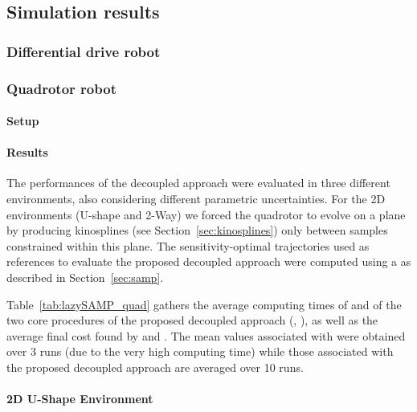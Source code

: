 \subsection{Simulation results}
\subsubsection{Differential drive robot}
\subsubsection{Quadrotor robot}

\paragraph{Setup}

\paragraph{Results}



The performances of the decoupled approach were evaluated in three different environments, also considering different parametric uncertainties.
For the 2D environments (U-shape and 2-Way) we forced the quadrotor to evolve on a plane by producing kinosplines (see Section~\ref{sec:kinosplines}) only between samples constrained within this plane.
The sensitivity-optimal trajectories used as references to evaluate the proposed decoupled approach were computed using a  as described in Section~\ref{sec:samp}.

Table~\ref{tab:lazySAMP_quad} gathers the average computing times of  and of the two core procedures of the proposed decoupled approach (, ), as well as the average final cost found by  and . 
The mean values associated with  were obtained over 3 runs (due to the very high computing time) while those associated with the proposed decoupled approach are averaged over 10 runs.

\paragraph{2D U-Shape Environment} 

